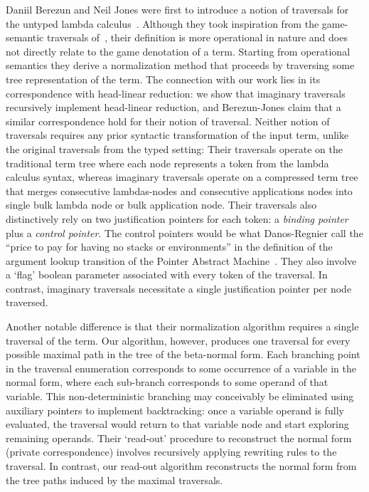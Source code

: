 \documentclass[xchauthor,chkrefs,GCNS,amsmath,amsthm,rotating,leaveRGB]{tcsg}
\theoremstyle{plain}
\theoremstyle{definition}
\begin{document}
Daniil Berezun and Neil Jones were first to introduce a notion of traversals
for the untyped lambda calculus~\cite{JonesBerezunLLL-PEPM17}. Although they
took inspiration from the game-semantic traversals
of~\cite{OngLics2006,BlumGalop2008}, their definition is more operational in
nature and does not directly relate to the game denotation of a term.
Starting from operational semantics they derive a normalization method that
proceeds by traversing some tree representation of the term. The connection
with our work lies in its correspondence with head-linear reduction: we show
that imaginary traversals recursively implement head-linear reduction, and
Berezun-Jones claim that a similar correspondence hold for their notion of
traversal. Neither notion of traversals requires any prior syntactic
transformation of the input term, unlike the original traversals from the
typed setting: Their traversals operate on the traditional term tree where
each node represents a token from the lambda calculus syntax, whereas
imaginary traversals operate on a compressed term tree that merges
consecutive lambdas-nodes and consecutive applications nodes into single bulk
lambda node or bulk application node. Their traversals also distinctively
rely on two justification pointers for each token: a \emph{binding pointer}
plus a \emph{control pointer}. The control pointers would be what
Danos-Regnier call the ``price to pay for having no stacks or environments''
in the definition of the argument lookup transition of the Pointer Abstract
Machine~\cite{danos-head}. They also involve a `flag' boolean parameter
associated with every token of the traversal. In contrast, imaginary
traversals necessitate a single justification pointer per node traversed.

Another notable difference is that their normalization algorithm requires a
single traversal of the term. Our algorithm, however, produces one
traversal for every possible maximal path in the tree of the beta-normal
form. Each branching point in the traversal enumeration corresponds to some
occurrence of a variable in the normal form, where each sub-branch
corresponds to some operand of that variable. This non-deterministic
branching may conceivably be eliminated using auxiliary pointers to implement
backtracking: once a variable operand is fully evaluated, the traversal would
return to that variable node and start exploring remaining operands. Their
`read-out' procedure to reconstruct the normal form (private correspondence)
involves recursively applying rewriting rules to the traversal. In contrast,
our read-out algorithm reconstructs the normal form from the tree paths
induced by the maximal traversals.
\end{document}
